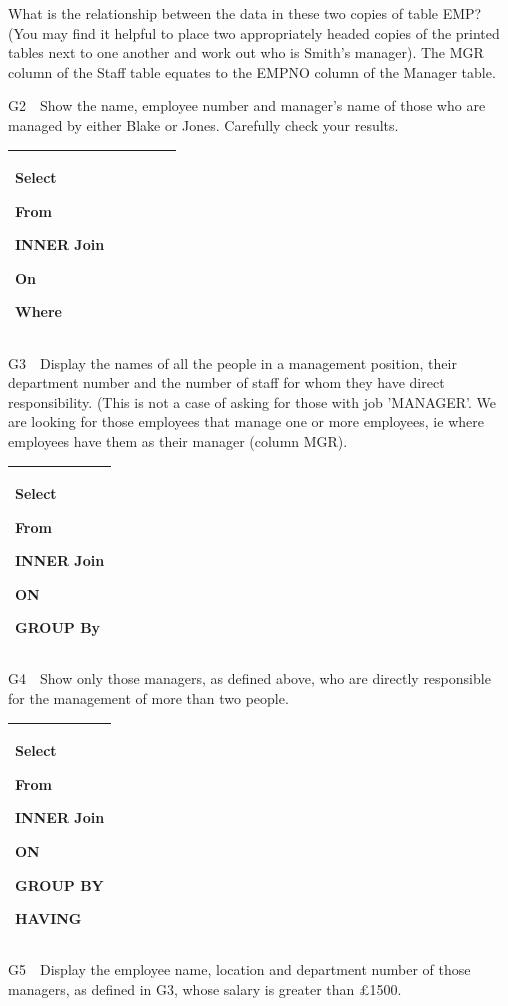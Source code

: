 What is the relationship between the data in these two copies of table EMP?  (You may find it helpful to place two appropriately headed copies of the printed tables next to one another and work out who is Smith's manager).  The MGR column of the Staff table equates to the EMPNO column of the Manager table.

G2\ \ Show the name, employee number and manager's name of those who are managed by either Blake or Jones.  Carefully check your results.

\begin{flushleft}
\tablefirsthead{}
\tablehead{}
\tabletail{}
\tablelasttail{}
\begin{supertabular}{|m{14.793cm}|}
\hline
Select

From

INNER Join\ \ \ \ \ \ \ \ 

On

Where\\\hline
\end{supertabular}
\end{flushleft}
G3\ \ Display the names of all the people in a management position, their department number and the number of staff for whom they have direct responsibility.  (This is not a case of asking for those with job 'MANAGER'.  We are looking for those employees that manage one or more employees, ie where employees have them as their manager (column MGR).

\begin{flushleft}
\tablefirsthead{}
\tablehead{}
\tabletail{}
\tablelasttail{}
\begin{supertabular}{|m{14.583cm}|}
\hline
Select

From

INNER Join

ON

GROUP By

\\\hline
\end{supertabular}
\end{flushleft}
G4\ \ Show only those managers, as defined above, who are directly responsible for the management of more than two people.

\begin{flushleft}
\tablefirsthead{}
\tablehead{}
\tabletail{}
\tablelasttail{}
\begin{supertabular}{|m{14.583cm}|}
\hline
Select

From

INNER Join

ON

GROUP BY

HAVING

\\\hline
\end{supertabular}
\end{flushleft}
G5\ \ Display the employee name, location and department number of those managers, as defined in G3, whose salary is greater than £1500. 

